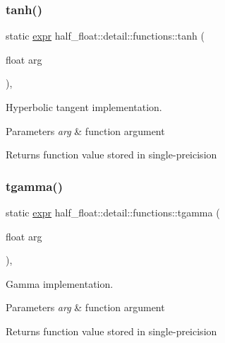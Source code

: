 \subsubsection{\texorpdfstring{tanh()}{tanh()}}
{\footnotesize\ttfamily static \hyperlink{structhalf__float_1_1detail_1_1expr}{expr} half\+\_\+float\+::detail\+::functions\+::tanh (\begin{DoxyParamCaption}\item[{float}]{arg }\end{DoxyParamCaption})\hspace{0.3cm}{\ttfamily [inline]}, {\ttfamily [static]}}

Hyperbolic tangent implementation. 
\begin{DoxyParams}{Parameters}
{\em arg} & function argument \\
\hline
\end{DoxyParams}
\begin{DoxyReturn}{Returns}
function value stored in single-\/preicision 
\end{DoxyReturn}
\mbox{\label{structhalf__float_1_1detail_1_1functions_a2e732684ac8c44f7a546010a299136bb}} 
\subsubsection{\texorpdfstring{tgamma()}{tgamma()}}
{\footnotesize\ttfamily static \hyperlink{structhalf__float_1_1detail_1_1expr}{expr} half\+\_\+float\+::detail\+::functions\+::tgamma (\begin{DoxyParamCaption}\item[{float}]{arg }\end{DoxyParamCaption})\hspace{0.3cm}{\ttfamily [inline]}, {\ttfamily [static]}}

Gamma implementation. 
\begin{DoxyParams}{Parameters}
{\em arg} & function argument \\
\hline
\end{DoxyParams}
\begin{DoxyReturn}{Returns}
function value stored in single-\/preicision 
\end{DoxyReturn}
\mbox{\label{structhalf__float_1_1detail_1_1functions_ae57908c6ec13fb42daf326811f99038b}} 

